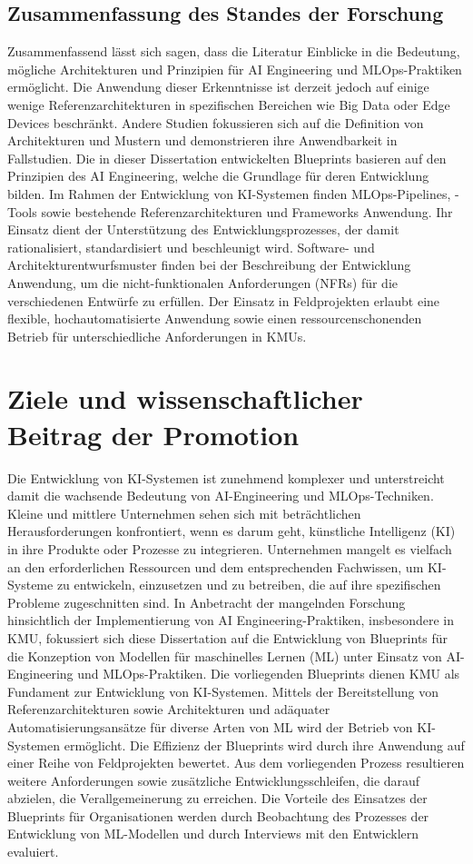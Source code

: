 \documentclass[11pt,a4paper,pointlessnumbers]{scrartcl}
\theoremstyle{break}
\numberwithin{equation}{section}
\begin{document}
\subsection{Zusammenfassung des Standes der Forschung}
Zusammenfassend lässt sich sagen, dass die Literatur Einblicke in die Bedeutung, mögliche Architekturen und Prinzipien für AI Engineering und MLOps-Praktiken ermöglicht. Die Anwendung dieser Erkenntnisse ist derzeit jedoch auf einige wenige Referenzarchitekturen in spezifischen Bereichen wie Big Data oder Edge Devices beschränkt. Andere Studien fokussieren sich auf die Definition von Architekturen und Mustern und demonstrieren ihre Anwendbarkeit in Fallstudien. Die in dieser Dissertation entwickelten Blueprints basieren auf den Prinzipien des AI Engineering, welche die Grundlage für deren Entwicklung bilden. Im Rahmen der Entwicklung von KI-Systemen finden MLOps-Pipelines, -Tools sowie bestehende Referenzarchitekturen und Frameworks Anwendung. Ihr Einsatz dient der Unterstützung des Entwicklungsprozesses, der damit rationalisiert, standardisiert und beschleunigt wird. 
Software- und Architekturentwurfsmuster finden bei der Beschreibung der Entwicklung Anwendung, um die nicht-funktionalen Anforderungen (NFRs) für die verschiedenen Entwürfe zu erfüllen. Der Einsatz in Feldprojekten erlaubt eine flexible, hochautomatisierte Anwendung sowie einen ressourcenschonenden Betrieb für unterschiedliche Anforderungen in KMUs.

\section{Ziele und wissenschaftlicher Beitrag der Promotion}
Die Entwicklung von KI-Systemen ist zunehmend komplexer und unterstreicht damit die wachsende Bedeutung von AI-Engineering und MLOps-Techniken. Kleine und mittlere Unternehmen sehen sich mit beträchtlichen Herausforderungen konfrontiert, wenn es darum geht, künstliche Intelligenz (KI) in ihre Produkte oder Prozesse zu integrieren. Unternehmen mangelt es vielfach an den erforderlichen Ressourcen und dem entsprechenden Fachwissen, um KI-Systeme zu entwickeln, einzusetzen und zu betreiben, die auf ihre spezifischen Probleme zugeschnitten sind. In Anbetracht der mangelnden Forschung hinsichtlich der Implementierung von AI Engineering-Praktiken, insbesondere in KMU, fokussiert sich diese Dissertation auf die Entwicklung von Blueprints für die Konzeption von Modellen für maschinelles Lernen (ML) unter Einsatz von AI-Engineering und MLOps-Praktiken. Die vorliegenden Blueprints dienen KMU als Fundament zur Entwicklung von KI-Systemen. Mittels der Bereitstellung von Referenzarchitekturen sowie Architekturen und adäquater Automatisierungsansätze für diverse Arten von ML wird der Betrieb von KI-Systemen ermöglicht. Die Effizienz der Blueprints wird durch ihre Anwendung auf einer Reihe von Feldprojekten bewertet. Aus dem vorliegenden Prozess resultieren weitere Anforderungen sowie zusätzliche Entwicklungsschleifen, die darauf abzielen, die Verallgemeinerung zu erreichen. Die Vorteile des Einsatzes der Blueprints für Organisationen werden durch Beobachtung des Prozesses der Entwicklung von ML-Modellen und durch Interviews mit den Entwicklern evaluiert. 
\end{document}
